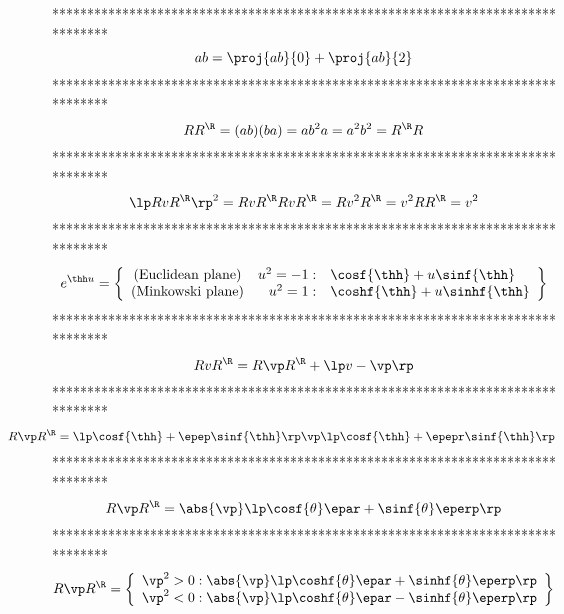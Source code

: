 ********************************************************************************
\begin{equation}\label{EQ1_31}
ab = \proj{ab}{0}+\proj{ab}{2}
\end{equation}
********************************************************************************
\begin{equation}\label{EQ1_32}
RR^{\R} = (ab)(ba) = ab^{2}a = a^{2}b^{2} = R^{\R}R
\end{equation}
********************************************************************************
\begin{equation}\label{EQ1_33}
     \lp RvR^{\R}\rp^{2} = RvR^{\R}RvR^{\R} = Rv^{2}R^{\R} = v^{2}RR^{\R} = v^{2}
\end{equation}
********************************************************************************
\begin{equation}\label{EQ1_34}
e^{\thh u} = \left \{
\begin{array}{crl}
\mbox{(Euclidean plane)} & u^{2} = -1: & \cosf{\thh}+u\sinf{\thh} \\
\mbox{(Minkowski plane)} & u^{2} = 1:  & \coshf{\thh}+u\sinhf{\thh} \\
\end{array}
\right \}
\end{equation}
********************************************************************************
\begin{equation}\label{EQ1_35}
RvR^{\R} = R\vp R^{\R} +\lp v-\vp \rp
\end{equation}
********************************************************************************
\begin{equation}\label{EQ1_36}
\hspace{-0.5in}R\vp R^{\R} =  \lp \cosf{\thh}+\epep\sinf{\thh}\rp\vp\lp\cosf{\thh}+\epepr\sinf{\thh}\rp
\end{equation}
********************************************************************************
\begin{equation}\label{EQ1_37}
R\vp R^{\R} = \abs{\vp}\lp \cosf{\theta}\epar+\sinf{\theta}\eperp \rp
\end{equation}
********************************************************************************
\begin{equation}\label{EQ1_38}
R\vp R^{\R} = \left \{
\begin{array}{c}
\vp^{2} > 0: \abs{\vp}\lp\coshf{\theta}\epar+\sinhf{\theta}\eperp \rp  \\
\vp^{2} < 0: \abs{\vp}\lp\coshf{\theta}\epar-\sinhf{\theta}\eperp \rp  \\
\end{array}
\right \}
\end{equation}
